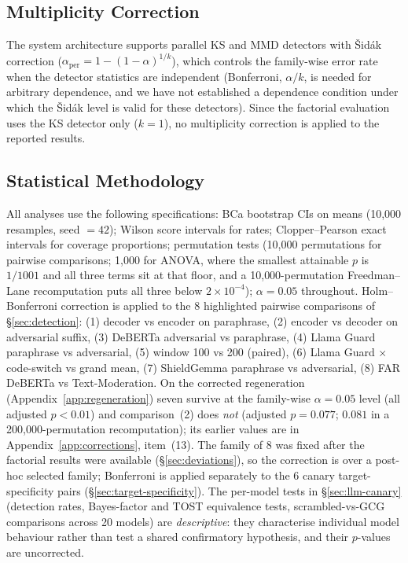 \documentclass{article}
\begin{document}
\subsection{Multiplicity Correction}
\label{sec:multiplicity}

The system architecture supports parallel KS and MMD detectors with \v{S}id\'{a}k correction ($\alpha_{\text{per}} = 1 - (1-\alpha)^{1/k}$), which controls the family-wise error rate when the detector statistics are independent (Bonferroni, $\alpha/k$, is needed for arbitrary dependence, and we have not established a dependence condition under which the \v{S}id\'{a}k level is valid for these detectors). Since the factorial evaluation uses the KS detector only ($k = 1$), no multiplicity correction is applied to the reported results.

\subsection{Statistical Methodology}
\label{sec:stats}

All analyses use the following specifications: BCa bootstrap CIs on means (10{,}000 resamples, seed $= 42$); Wilson score intervals for rates; Clopper--Pearson exact intervals for coverage proportions; permutation tests (10{,}000 permutations for pairwise comparisons; 1{,}000 for ANOVA, where the smallest attainable $p$ is $1/1001$ and all three terms sit at that floor, and a 10{,}000-permutation Freedman--Lane recomputation puts all three below $2\times10^{-4}$); $\alpha = 0.05$ throughout. Holm--Bonferroni correction is applied to the 8 highlighted pairwise comparisons of \S\ref{sec:detection}: (1) decoder vs encoder on paraphrase, (2) encoder vs decoder on adversarial suffix, (3) DeBERTa adversarial vs paraphrase, (4) Llama Guard paraphrase vs adversarial, (5) window 100 vs 200 (paired), (6) Llama Guard $\times$ code-switch vs grand mean, (7) ShieldGemma paraphrase vs adversarial, (8) FAR DeBERTa vs Text-Moderation. On the corrected regeneration (Appendix~\ref{app:regeneration}) seven survive at the family-wise $\alpha = 0.05$ level (all adjusted $p<0.01$) and comparison~(2) does \emph{not} (adjusted $p = 0.077$; $0.081$ in a 200{,}000-permutation recomputation); its earlier values are in Appendix~\ref{app:corrections}, item~(13). The family of 8 was fixed after the factorial results were available (\S\ref{sec:deviations}), so the correction is over a post-hoc selected family; Bonferroni is applied separately to the 6 canary target-specificity pairs (\S\ref{sec:target-specificity}). The per-model tests in \S\ref{sec:llm-canary} (detection rates, Bayes-factor and TOST equivalence tests, scrambled-vs-GCG comparisons across 20 models) are \emph{descriptive}: they characterise individual model behaviour rather than test a shared confirmatory hypothesis, and their $p$-values are uncorrected.
\end{document}
